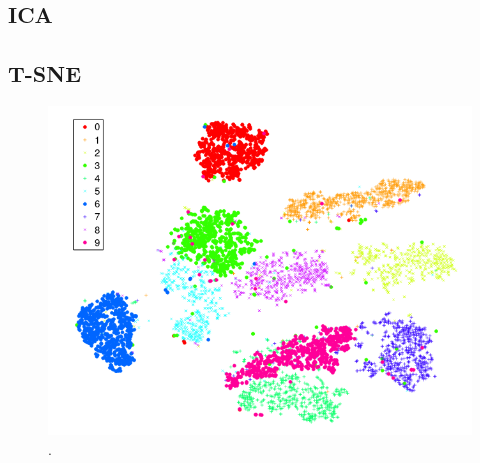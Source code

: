 % 

\subsection{ICA}



% 

\subsection{T-SNE}

\begin{figure}[H]
    \caption{.}
    \begin{center}
        \includegraphics[scale=.45]{referencial/img/t-sne_matten_p2590.png}
    \end{center}
    \label{fig:}
\end{figure}

% 


